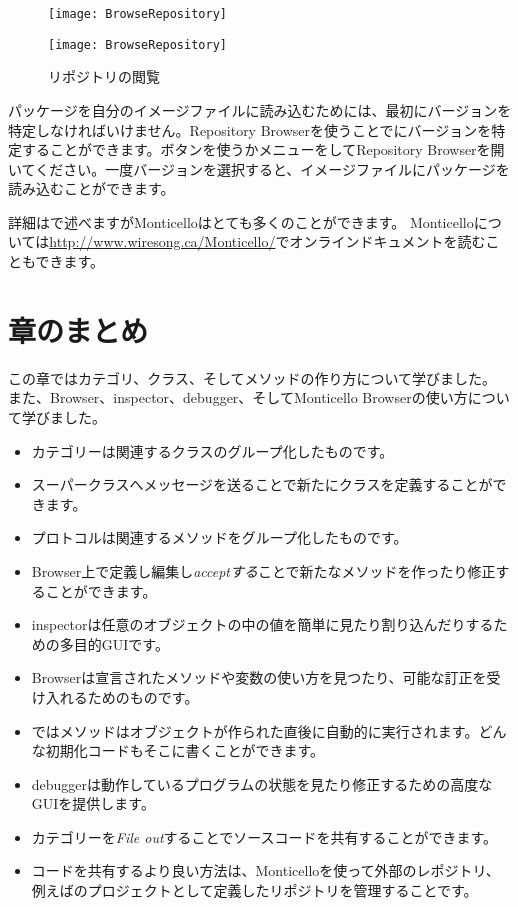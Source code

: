 \documentclass[a4paper,10pt,twoside]{book}
\begin{document}
\begin{figure}[hbt]
\ifluluelse
	{\centerline {\texttt{[image: BrowseRepository]}}}
	{\centerline {\texttt{[image: BrowseRepository]}}}
\caption{リポジトリの閲覧
}
\end{figure}


パッケージを自分のイメージファイルに読み込むためには、最初にバージョンを特定しなければいけません。Repository Browserを使うことでにバージョンを特定することができます。ボタンを使うかメニューを\actclick してRepository Browserを開いてください。一度バージョンを選択すると、イメージファイルにパッケージを読み込むことができます。


詳細はで述べますがMonticelloはとても多くのことができます。
Monticelloについては\url{http://www.wiresong.ca/Monticello/}でオンラインドキュメントを読むこともできます。

\section{章のまとめ}
この章ではカテゴリ、クラス、そしてメソッドの作り方について学びました。
また、Browser、inspector、debugger、そしてMonticello Browserの使い方について学びました。

\begin{itemize}
  \item カテゴリーは関連するクラスのグループ化したものです。
  \item スーパークラスへメッセージを送ることで新たにクラスを定義することができます。
  \item プロトコルは関連するメソッドをグループ化したものです。
  \item Browser上で定義し編集し\emph{acceptする}ことで新たなメソッドを作ったり修正することができます。
  \item inspectorは任意のオブジェクトの中の値を簡単に見たり割り込んだりするための多目的GUIです。
  \item Browserは宣言されたメソッドや変数の使い方を見つたり、可能な訂正を受け入れるためのものです。
  \item \pharo ではメソッドはオブジェクトが作られた直後に自動的に実行されます。どんな初期化コードもそこに書くことができます。
  \item debuggerは動作しているプログラムの状態を見たり修正するための高度なGUIを提供します。
  \item カテゴリーを\emph{File out}することでソースコードを共有することができます。
  \item コードを共有するより良い方法は、Monticelloを使って外部のレポジトリ、例えば\sqsrc のプロジェクトとして定義したリポジトリを管理することです。
\end{itemize}

\ifx\wholebook\relax\else
\end{document}
